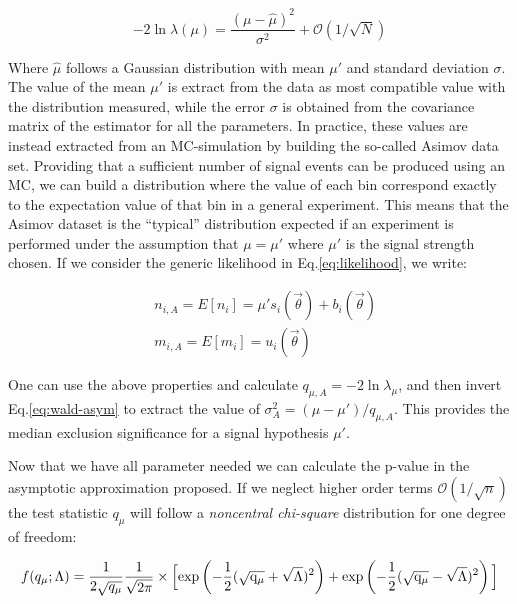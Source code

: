 \begin{equation}
  \label{eq:wald-asym}
  - 2 \ln{\lambda(\mu)} = \frac{(\mu - \hat{\mu})^2}{\sigma^2} + \mathcal{O}(1/\sqrt{N})
\end{equation}

Where $\hat{\mu}$ follows a Gaussian distribution with mean $\mu'$ and standard deviation $\sigma$. The value of the mean $\mu'$ is extract from the data as most compatible value with the distribution measured, while the error $\sigma$ is obtained from the covariance matrix of the estimator for all the parameters. In practice, these values are instead extracted from an MC-simulation by building the so-called Asimov data set. Providing that a sufficient number of signal events can be produced using an MC, we can build a distribution where the value of each bin correspond exactly to the expectation value of that bin in a general experiment. This means that the Asimov dataset is the ``typical'' distribution expected if an experiment is performed under the assumption that $\mu = \mu'$ where $\mu'$ is the signal strength chosen. If we consider the generic likelihood in Eq.\ref{eq:likelihood}, we write:

\begin{equation}
  \label{eq:asimov-dataset-prop}
  \begin{aligned}
    &n_{i, A} = E[n_i] = \mu' s_i (\vec{\theta}) + b_i(\vec{\theta}) \\
    &m_{i, A} = E[m_i] = u_i(\vec{\theta})
  \end{aligned}    
\end{equation}

One can use the above properties and calculate $q_{\mu, A} = - 2 \ln{\lambda_{\mu}}$, and then invert Eq.\ref{eq:wald-asym} to extract the value of $\sigma^2_{A} = (\mu - \mu')/q_{\mu,A}$. This provides the median exclusion significance for a signal hypothesis $\mu'$.

Now that we have all parameter needed  we can calculate the p-value in the asymptotic approximation proposed. If we neglect higher order terms $\mathcal{O}(1/\sqrt{n})$ the test statistic $q_{\mu}$ will follow a \textit{noncentral chi-square} distribution for one degree of freedom:

\begin{equation}
  \label{eq:p-value-asym}
  f(q_{\mu}; \Lambda) = \frac{1}{2\sqrt{q_{\mu}}} \frac{1}{\sqrt{2\pi}} \times \Big[ \rm{exp}\left(-\frac{1}{2} (\sqrt{q_{\mu}} + \sqrt{\Lambda})^2 \right) + \rm{exp}\left(-\frac{1}{2} (\sqrt{q_{\mu}} - \sqrt{\Lambda})^2 \right) \Big]
\end{equation}

